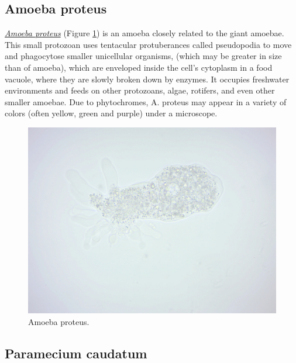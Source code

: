 \subsection{Amoeba proteus}\label{amoeba-proteus}

\href{https://en.wikipedia.org/wiki/Amoeba_proteus}{\emph{Amoeba
proteus}} (Figure \ref{fig:amoeba}) is an amoeba closely related to the
giant amoebae. This small protozoan uses tentacular protuberances called
pseudopodia to move and phagocytose smaller unicellular organisms,
(which may be greater in size than of amoeba), which are enveloped
inside the cell's cytoplasm in a food vacuole, where they are slowly
broken down by enzymes. It occupies freshwater environments and feeds on
other protozoans, algae, rotifers, and even other smaller amoebae. Due
to phytochromes, A. proteus may appear in a variety of colors (often
yellow, green and purple) under a microscope.

\begin{figure}

{\centering \includegraphics[width=0.7\linewidth]{./figures/protists/Amoeba_proteus}

}

\caption{Amoeba proteus.}\label{fig:amoeba}
\end{figure}

\subsection{Paramecium caudatum}\label{paramecium-caudatum}

